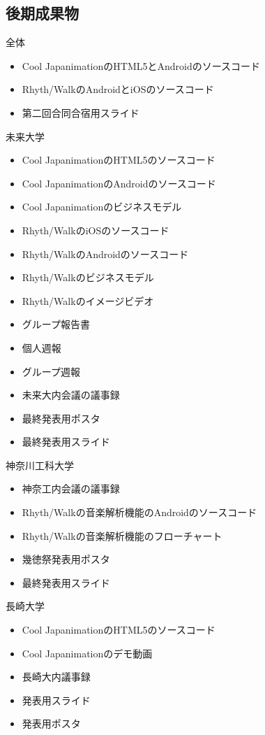 \subsection{後期成果物}

全体
\begin{itemize}
\item Cool JapanimationのHTML5とAndroidのソースコード
\item Rhyth/WalkのAndroidとiOSのソースコード
\item 第二回合同合宿用スライド
\end{itemize}

未来大学
\begin{itemize}
\item Cool JapanimationのHTML5のソースコード
\item Cool JapanimationのAndroidのソースコード
\item Cool Japanimationのビジネスモデル
\item Rhyth/WalkのiOSのソースコード
\item Rhyth/WalkのAndroidのソースコード
\item Rhyth/Walkのビジネスモデル
\item Rhyth/Walkのイメージビデオ
\item グループ報告書
\item 個人週報
\item グループ週報
\item 未来大内会議の議事録
\item 最終発表用ポスタ
\item 最終発表用スライド
\end{itemize}

神奈川工科大学
\begin{itemize}
\item 神奈工内会議の議事録
\item Rhyth/Walkの音楽解析機能のAndroidのソースコード
\item Rhyth/Walkの音楽解析機能のフローチャート
\item 幾徳祭発表用ポスタ
\item 最終発表用スライド
\end{itemize}

長崎大学
\begin{itemize}
\item Cool JapanimationのHTML5のソースコード
\item Cool Japanimationのデモ動画
\item 長崎大内議事録
\item 発表用スライド
\item 発表用ポスタ
\end{itemize}
